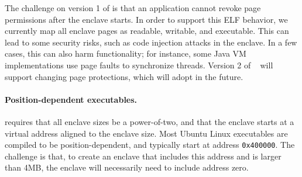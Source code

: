 The challenge on version 1 of \sgx{} is that an application cannot revoke page
permissions after the enclave starts.
In order to support this ELF behavior, we currently map all enclave pages
as readable, writable, and executable.
This can lead to some security risks, such as code injection attacks in the enclave.
In a few cases, this can also harm functionality; for instance, some Java VM implementations
use page faults to synchronize threads.
Version 2 of \sgx{}~\cite{sgx2} will support changing page protections,
which \graphenesgx{} will adopt in the future. %




\paragraph{Position-dependent executables.}
\sgx{} requires that all enclave sizes be a power-of-two,
and that the enclave starts at a virtual address aligned to the enclave size.
Most Ubuntu Linux executables are compiled to be position-dependent, and typically 
start at address 
{\tt 0x400000}.  The challenge is that, to create an enclave  that includes this address and is larger than 4MB, the enclave
will necessarily need to include address zero.


